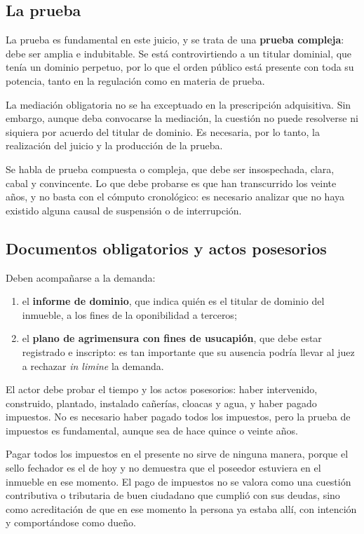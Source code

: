 \documentclass[12pt,oneside]{book}
\begin{document}
\subsection{La prueba}

La prueba es fundamental en este juicio, y se trata de una \textbf{prueba compleja}: debe ser amplia e indubitable. Se está controvirtiendo a un titular dominial, que tenía un dominio perpetuo, por lo que el orden público está presente con toda su potencia, tanto en la regulación como en materia de prueba.

La mediación obligatoria no se ha exceptuado en la prescripción adquisitiva. Sin embargo, aunque deba convocarse la mediación, la cuestión no puede resolverse ni siquiera por acuerdo del titular de dominio. Es necesaria, por lo tanto, la realización del juicio y la producción de la prueba.

Se habla de prueba compuesta o compleja, que debe ser insospechada, clara, cabal y convincente. Lo que debe probarse es que han transcurrido los veinte años, y no basta con el cómputo cronológico: es necesario analizar que no haya existido alguna causal de suspensión o de interrupción.

\subsection{Documentos obligatorios y actos posesorios}

Deben acompañarse a la demanda:
\begin{enumerate}
    \item el \textbf{informe de dominio}, que indica quién es el titular de dominio del inmueble, a los fines de la oponibilidad a terceros;
    \item el \textbf{plano de agrimensura con fines de usucapión}, que debe estar registrado e inscripto: es tan importante que su ausencia podría llevar al juez a rechazar \textit{in limine} la demanda.
\end{enumerate}

El actor debe probar el tiempo y los actos posesorios: haber intervenido, construido, plantado, instalado cañerías, cloacas y agua, y haber pagado impuestos. No es necesario haber pagado todos los impuestos, pero la prueba de impuestos es fundamental, aunque sea de hace quince o veinte años.

\begin{importante}
Pagar todos los impuestos en el presente no sirve de ninguna manera, porque el sello fechador es el de hoy y no demuestra que el poseedor estuviera en el inmueble en ese momento. El pago de impuestos no se valora como una cuestión contributiva o tributaria de buen ciudadano que cumplió con sus deudas, sino como acreditación de que en ese momento la persona ya estaba allí, con intención y comportándose como dueño.
\end{importante}
\end{document}
